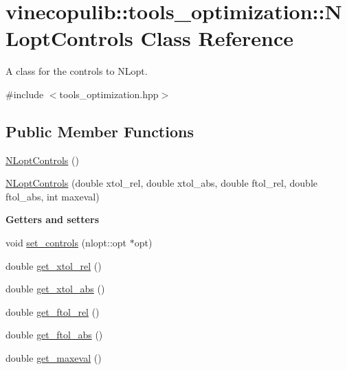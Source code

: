 \hypertarget{classvinecopulib_1_1tools__optimization_1_1_n_lopt_controls}{}\section{vinecopulib\+:\+:tools\+\_\+optimization\+:\+:N\+Lopt\+Controls Class Reference}
\label{classvinecopulib_1_1tools__optimization_1_1_n_lopt_controls}


A class for the controls to N\+Lopt.  




{\ttfamily \#include $<$tools\+\_\+optimization.\+hpp$>$}

\subsection*{Public Member Functions}
\begin{DoxyCompactItemize}
\item 
\hyperlink{classvinecopulib_1_1tools__optimization_1_1_n_lopt_controls_aaa09bb2bbf7dcbfcaaae4921b053c502}{N\+Lopt\+Controls} ()
\item 
\hyperlink{classvinecopulib_1_1tools__optimization_1_1_n_lopt_controls_aa8f12e7923d8dc5a28a49c6f23f204db}{N\+Lopt\+Controls} (double xtol\+\_\+rel, double xtol\+\_\+abs, double ftol\+\_\+rel, double ftol\+\_\+abs, int maxeval)
\end{DoxyCompactItemize}
\begin{Indent}{\bf Getters and setters}\par
\begin{DoxyCompactItemize}
\item 
void \hyperlink{classvinecopulib_1_1tools__optimization_1_1_n_lopt_controls_ab48d26a305e4ac805249605a60db4257}{set\+\_\+controls} (nlopt\+::opt $\ast$opt)
\item 
double \hyperlink{classvinecopulib_1_1tools__optimization_1_1_n_lopt_controls_a27400ff85f220911c2937ca16dd51697}{get\+\_\+xtol\+\_\+rel} ()
\item 
double \hyperlink{classvinecopulib_1_1tools__optimization_1_1_n_lopt_controls_a65494c81f12ff414259fd72593c545a6}{get\+\_\+xtol\+\_\+abs} ()
\item 
double \hyperlink{classvinecopulib_1_1tools__optimization_1_1_n_lopt_controls_a583ccb19e633f7408a1311aa250aabf7}{get\+\_\+ftol\+\_\+rel} ()
\item 
double \hyperlink{classvinecopulib_1_1tools__optimization_1_1_n_lopt_controls_ae96aba7bd7580c68216419722cafd3ec}{get\+\_\+ftol\+\_\+abs} ()
\item 
double \hyperlink{classvinecopulib_1_1tools__optimization_1_1_n_lopt_controls_a965d9632e85fae19778694bdfcbe1ea5}{get\+\_\+maxeval} ()
\end{DoxyCompactItemize}
\end{Indent}


